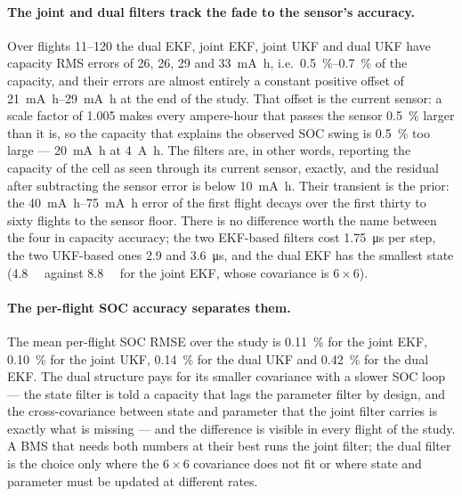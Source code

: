 \paragraph{The joint and dual filters track the fade to the sensor's accuracy.} Over flights
11--120 the dual EKF, joint EKF, joint UKF and dual UKF have capacity RMS errors of \num{26},
\num{26}, \num{29} and \SI{33}{\milli\ampere\hour}, i.e.\ \SIrange{0.5}{0.7}{\percent} of the
capacity, and their errors are almost entirely a constant positive offset of
\SIrange{+21}{+29}{\milli\ampere\hour} at the end of the study. That offset is the current
sensor: a scale factor of \num{1.005} makes every ampere-hour that passes the sensor
\SI{0.5}{\percent} larger than it is, so the capacity that explains the observed SOC swing is
\SI{0.5}{\percent} too large --- \SI{20}{\milli\ampere\hour} at \SI{4}{\ampere\hour}. The
filters are, in other words, reporting the capacity of the cell as seen through its current
sensor, exactly, and the residual after subtracting the sensor error is below
\SI{10}{\milli\ampere\hour}. Their transient is the prior: the \SIrange{40}{75}{\milli\ampere\hour} error of the
first flight decays over the first thirty to sixty flights to the sensor floor. There is no difference worth the name between the four in capacity accuracy; the two
EKF-based filters cost \SI{1.75}{\micro\second} per step, the two UKF-based ones \num{2.9} and
\SI{3.6}{\micro\second}, and the dual EKF has the smallest state (\SI{4.8}{\kilo\byte} against
\SI{8.8}{\kilo\byte} for the joint EKF, whose covariance is $6\times6$).

\paragraph{The per-flight SOC accuracy separates them.} The mean per-flight SOC RMSE over the
study is \SI{0.11}{\percent} for the joint EKF, \SI{0.10}{\percent} for the joint UKF,
\SI{0.14}{\percent} for the dual UKF and \SI{0.42}{\percent} for the dual EKF. The dual
structure pays for its smaller covariance with a slower SOC loop --- the state filter is told a
capacity that lags the parameter filter by design, and the cross-covariance between state and
parameter that the joint filter carries is exactly what is missing --- and the difference is
visible in every flight of the study. A BMS that needs both numbers at their best runs the
joint filter; the dual filter is the choice only where the $6\times6$ covariance does not fit
or where state and parameter must be updated at different rates.

